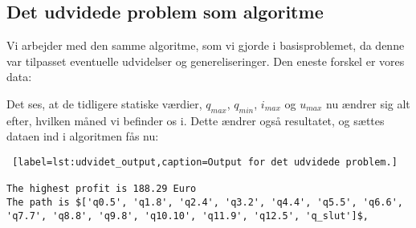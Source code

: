 \subsection{Det udvidede problem som algoritme}
Vi arbejder med den samme algoritme, som vi gjorde i basisproblemet, da denne var tilpasset eventuelle udvidelser og genereliseringer. Den eneste forskel er vores data:

 

Det ses, at de tidligere statiske værdier, $q_{max}$, $q_{min}$, $i_{max}$ og $u_{max}$ nu ændrer sig alt efter, hvilken måned vi befinder os i. Dette ændrer også resultatet, og sættes dataen ind i algoritmen fås nu:

\begin{lstlisting} [label=lst:udvidet_output,caption=Output for det udvidede problem.]

The highest profit is 188.29 Euro
The path is $['q0.5', 'q1.8', 'q2.4', 'q3.2', 'q4.4', 'q5.5', 'q6.6', 'q7.7', 'q8.8', 'q9.8', 'q10.10', 'q11.9', 'q12.5', 'q_slut']$,

\end{lstlisting}